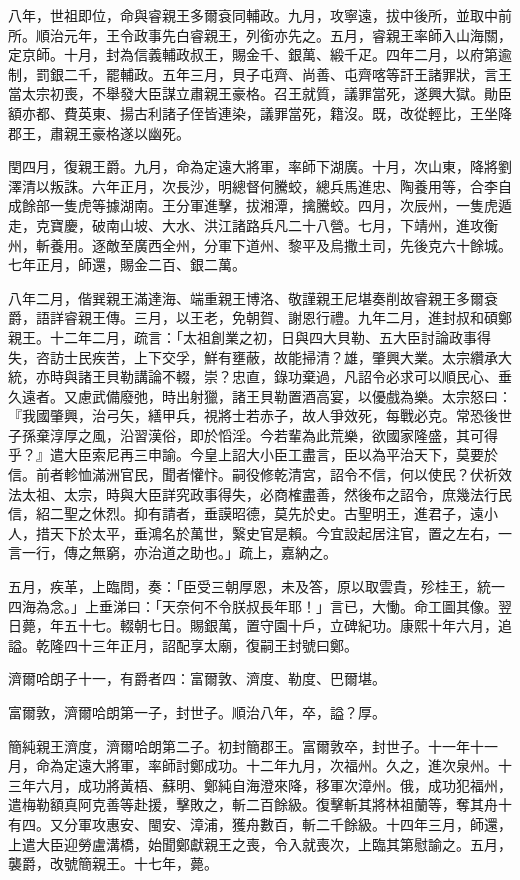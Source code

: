 \begin{pinyinscope}
八年，世祖即位，命與睿親王多爾袞同輔政。九月，攻寧遠，拔中後所，並取中前所。順治元年，王令政事先白睿親王，列銜亦先之。五月，睿親王率師入山海關，定京師。十月，封為信義輔政叔王，賜金千、銀萬、緞千疋。四年二月，以府第逾制，罰銀二千，罷輔政。五年三月，貝子屯齊、尚善、屯齊喀等訐王諸罪狀，言王當太宗初喪，不舉發大臣謀立肅親王豪格。召王就質，議罪當死，遂興大獄。勛臣額亦都、費英東、揚古利諸子侄皆連染，議罪當死，籍沒。既，改從輕比，王坐降郡王，肅親王豪格遂以幽死。

閏四月，復親王爵。九月，命為定遠大將軍，率師下湖廣。十月，次山東，降將劉澤清以叛誅。六年正月，次長沙，明總督何騰蛟，總兵馬進忠、陶養用等，合李自成餘部一隻虎等據湖南。王分軍進擊，拔湘潭，擒騰蛟。四月，次辰州，一隻虎遁走，克寶慶，破南山坡、大水、洪江諸路兵凡二十八營。七月，下靖州，進攻衡州，斬養用。逐敵至廣西全州，分軍下道州、黎平及烏撒土司，先後克六十餘城。七年正月，師還，賜金二百、銀二萬。

八年二月，偕巽親王滿達海、端重親王博洛、敬謹親王尼堪奏削故睿親王多爾袞爵，語詳睿親王傳。三月，以王老，免朝賀、謝恩行禮。九年二月，進封叔和碩鄭親王。十二年二月，疏言：「太祖創業之初，日與四大貝勒、五大臣討論政事得失，咨訪士民疾苦，上下交孚，鮮有壅蔽，故能掃清？雄，肇興大業。太宗纘承大統，亦時與諸王貝勒講論不輟，崇？忠直，錄功棄過，凡詔令必求可以順民心、垂久遠者。又慮武備廢弛，時出射獵，諸王貝勒置酒高宴，以優戲為樂。太宗怒曰：『我國肇興，治弓矢，繕甲兵，視將士若赤子，故人爭效死，每戰必克。常恐後世子孫棄淳厚之風，沿習漢俗，即於慆淫。今若輩為此荒樂，欲國家隆盛，其可得乎？』遣大臣索尼再三申諭。今皇上詔大小臣工盡言，臣以為平治天下，莫要於信。前者軫恤滿洲官民，聞者懽忭。嗣役修乾清宮，詔令不信，何以使民？伏祈效法太祖、太宗，時與大臣詳究政事得失，必商榷盡善，然後布之詔令，庶幾法行民信，紹二聖之休烈。抑有請者，垂謨昭德，莫先於史。古聖明王，進君子，遠小人，措天下於太平，垂鴻名於萬世，繄史官是賴。今宜設起居注官，置之左右，一言一行，傳之無窮，亦治道之助也。」疏上，嘉納之。

五月，疾革，上臨問，奏：「臣受三朝厚恩，未及答，原以取雲貴，殄桂王，統一四海為念。」上垂涕曰：「天奈何不令朕叔長年耶！」言已，大慟。命工圖其像。翌日薨，年五十七。輟朝七日。賜銀萬，置守園十戶，立碑紀功。康熙十年六月，追謚。乾隆四十三年正月，詔配享太廟，復嗣王封號曰鄭。

濟爾哈朗子十一，有爵者四：富爾敦、濟度、勒度、巴爾堪。

富爾敦，濟爾哈朗第一子，封世子。順治八年，卒，謚？厚。

簡純親王濟度，濟爾哈朗第二子。初封簡郡王。富爾敦卒，封世子。十一年十一月，命為定遠大將軍，率師討鄭成功。十二年九月，次福州。久之，進次泉州。十三年六月，成功將黃梧、蘇明、鄭純自海澄來降，移軍次漳州。俄，成功犯福州，遣梅勒額真阿克善等赴援，擊敗之，斬二百餘級。復擊斬其將林祖蘭等，奪其舟十有四。又分軍攻惠安、閩安、漳浦，獲舟數百，斬二千餘級。十四年三月，師還，上遣大臣迎勞盧溝橋，始聞鄭獻親王之喪，令入就喪次，上臨其第慰諭之。五月，襲爵，改號簡親王。十七年，薨。


\end{pinyinscope}
